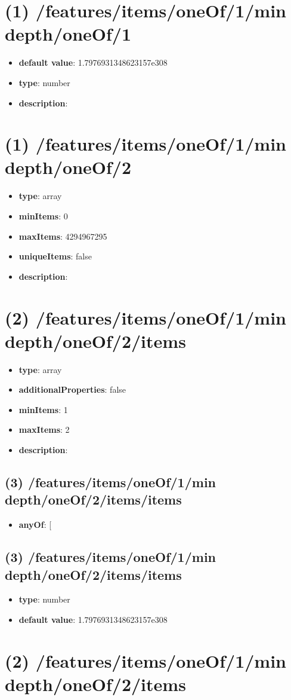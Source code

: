 \section{(1) /features/items/oneOf/1/min depth/oneOf/1}
\begin{itemize}[leftmargin=1em]\item {\bf default value}: 1.7976931348623157e308
\item {\bf type}: number
\item {\bf description}: 
\end{itemize}\section{(1) /features/items/oneOf/1/min depth/oneOf/2}
\begin{itemize}[leftmargin=1em]\item {\bf type}: array
\item {\bf minItems}: 0
\item {\bf maxItems}: 4294967295
\item {\bf uniqueItems}: false
\item {\bf description}: 
\end{itemize}\section{(2) /features/items/oneOf/1/min depth/oneOf/2/items}
\begin{itemize}[leftmargin=2em]\item {\bf type}: array
\item {\bf additionalProperties}: false
\item {\bf minItems}: 1
\item {\bf maxItems}: 2
\item {\bf description}: 
\end{itemize}\subsection{(3) /features/items/oneOf/1/min depth/oneOf/2/items/items}
\begin{itemize}[leftmargin=3em]\item {\bf anyOf}: [\end{itemize}\subsection{(3) /features/items/oneOf/1/min depth/oneOf/2/items/items}
\begin{itemize}[leftmargin=3em]\item {\bf type}: number\item {\bf default value}: 1.7976931348623157e308
\end{itemize}\section{(2) /features/items/oneOf/1/min depth/oneOf/2/items}
